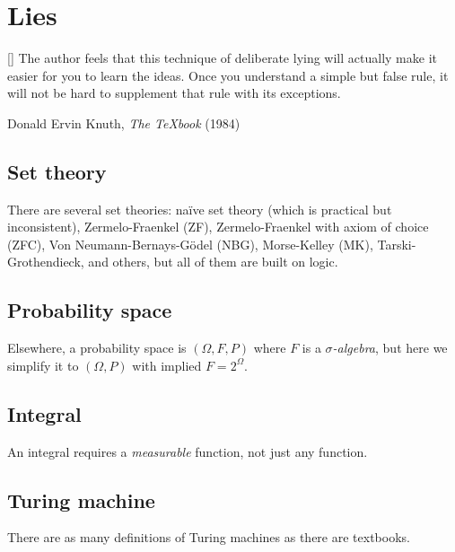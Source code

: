 \chapter{Lies}

\epigraph{
    [\textellipsis] The author feels that this technique of deliberate lying will actually make it easier for you to learn the ideas.
Once you understand a simple but false rule, it will not be hard to supplement that rule with its exceptions.
}{Donald Ervin Knuth, \emph{The \TeX{}book} (1984)}

\section{Set theory}

%
There are several set theories:
na\"ive set theory (which is practical but inconsistent),
Zermelo-Fraenkel (ZF),
Zermelo-Fraenkel with axiom of choice (ZFC),
Von Neumann-Bernays-G\"odel (NBG),
Morse-Kelley (MK),
Tarski-Grothendieck,
and others,
but all of them are built on logic.

\section{Probability space}

%
Elsewhere, a probability space is \((\Omega,F,P)\) where \(F\) is a \emph{\(\sigma\)-algebra},
but here we simplify it to \((\Omega,P)\) with implied \(F = 2^\Omega\).

\section{Integral}

%
%
%
An integral requires a \emph{measurable} function, not just any function.

\section{Turing machine}

There are as many definitions of Turing machines as there are textbooks.
